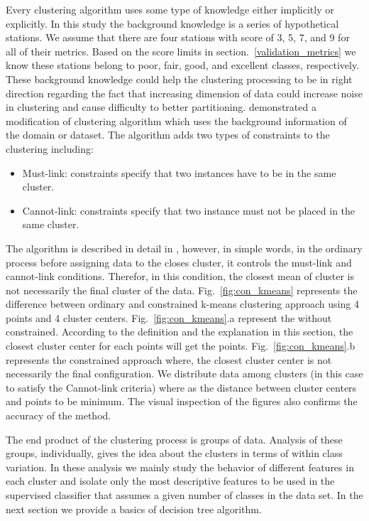Every clustering algorithm uses some type of knowledge either implicitly or explicitly. In this study the background knowledge is a series of hypothetical stations. We assume that there are four stations with score of 3, 5, 7, and 9 for all of their metrics. Based on the score limits in section.~\ref{validation_metrics} we know these stations belong to poor, fair, good, and excellent classes, respectively. These background knowledge could help the clustering processing to be in right direction regarding the fact that increasing dimension of data could increase noise in clustering and cause difficulty to better partitioning. \citet{Wagstaff_2001_Proc}  demonstrated a modification of \kmeans{} clustering algorithm which uses the background information of the domain or dataset. The algorithm adds two types of constraints to the clustering including:\\
\begin{itemize}
\item{Must-link: constraints specify that two instances have to be in the same cluster.}
\item{Cannot-link: constraints specify that two instance must not be placed in the same cluster.}
\end{itemize} 
The algorithm is described in detail in \citet{Wagstaff_2001_Proc}, however, in simple words, in the ordinary \kmeans{} process before assigning data to the closes cluster, it controls the must-link and cannot-link conditions. Therefor, in this condition, the closest mean of cluster is not necessarily the final cluster of the data. Fig.~\ref{fig:con_kmeans} represents the difference between ordinary and constrained k-means clustering approach using 4 points and 4 cluster centers. Fig.~\ref{fig:con_kmeans}.a represent the \kmeans{} without constrained. According to the definition and the explanation in this section, the closest cluster center for each points will get the points.
Fig.~\ref{fig:con_kmeans}.b represents the constrained \kmeans{} approach where, the closest cluster center is not necessarily the final configuration. We distribute data among clusters (in this case to satisfy the Cannot-link criteria) where as the distance between cluster centers and points to be minimum. The visual inspection of the figures also confirms the accuracy of the method.

The end product of the clustering process is groups of data. Analysis of these groups, individually, gives the idea about the clusters in terms of within class variation. In these analysis we mainly study the behavior of different features in each cluster and isolate only the most descriptive features to be used in the supervised classifier that assumes a given number of classes in the data set. In the next section we provide a basics of decision tree algorithm. 


